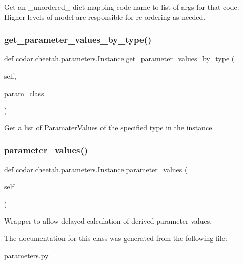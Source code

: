 \begin{DoxyVerb}Get an _unordered_ dict mapping code name to list of args for
that code. Higher levels of model are responsible for re-ordering
as needed.\end{DoxyVerb}
 \mbox{\label{classcodar_1_1cheetah_1_1parameters_1_1_instance_ab1187231851e554aa1e95f7e7eee7b77}} 
\subsubsection{\texorpdfstring{get\+\_\+parameter\+\_\+values\+\_\+by\+\_\+type()}{get\_parameter\_values\_by\_type()}}
{\footnotesize\ttfamily def codar.\+cheetah.\+parameters.\+Instance.\+get\+\_\+parameter\+\_\+values\+\_\+by\+\_\+type (\begin{DoxyParamCaption}\item[{}]{self,  }\item[{}]{param\+\_\+class }\end{DoxyParamCaption})}

\begin{DoxyVerb}Get a list of ParamaterValues of the specified type in the instance.
\end{DoxyVerb}
 \mbox{\label{classcodar_1_1cheetah_1_1parameters_1_1_instance_a4a943c0f5f3afe8b9a4ff9b238aab766}} 
\subsubsection{\texorpdfstring{parameter\+\_\+values()}{parameter\_values()}}
{\footnotesize\ttfamily def codar.\+cheetah.\+parameters.\+Instance.\+parameter\+\_\+values (\begin{DoxyParamCaption}\item[{}]{self }\end{DoxyParamCaption})}

\begin{DoxyVerb}Wrapper to allow delayed calculation of derived parameter values.\end{DoxyVerb}
 

The documentation for this class was generated from the following file\+:\begin{DoxyCompactItemize}
\item 
parameters.\+py\end{DoxyCompactItemize}
